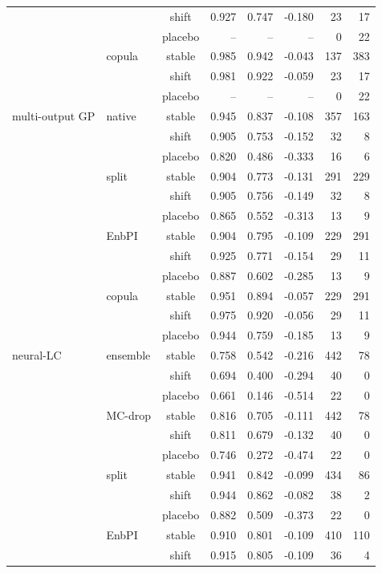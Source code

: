 {\begin{longtable}{@{}llcrrrrr@{}}
 &  & shift & 0.927 & 0.747 & -0.180 & 23 & 17 \\
 &  & placebo & -- & -- & -- & 0 & 22 \\
 & copula & stable & 0.985 & 0.942 & -0.043 & 137 & 383 \\
 &  & shift & 0.981 & 0.922 & -0.059 & 23 & 17 \\
 &  & placebo & -- & -- & -- & 0 & 22 \\
\addlinespace[2pt]
multi-output GP & native & stable & 0.945 & 0.837 & -0.108 & 357 & 163 \\
 &  & shift & 0.905 & 0.753 & -0.152 & 32 & 8 \\
 &  & placebo & 0.820 & 0.486 & -0.333 & 16 & 6 \\
 & split & stable & 0.904 & 0.773 & -0.131 & 291 & 229 \\
 &  & shift & 0.905 & 0.756 & -0.149 & 32 & 8 \\
 &  & placebo & 0.865 & 0.552 & -0.313 & 13 & 9 \\
 & EnbPI & stable & 0.904 & 0.795 & -0.109 & 229 & 291 \\
 &  & shift & 0.925 & 0.771 & -0.154 & 29 & 11 \\
 &  & placebo & 0.887 & 0.602 & -0.285 & 13 & 9 \\
 & copula & stable & 0.951 & 0.894 & -0.057 & 229 & 291 \\
 &  & shift & 0.975 & 0.920 & -0.056 & 29 & 11 \\
 &  & placebo & 0.944 & 0.759 & -0.185 & 13 & 9 \\
\addlinespace[2pt]
neural-LC & ensemble & stable & 0.758 & 0.542 & -0.216 & 442 & 78 \\
 &  & shift & 0.694 & 0.400 & -0.294 & 40 & 0 \\
 &  & placebo & 0.661 & 0.146 & -0.514 & 22 & 0 \\
 & MC-drop & stable & 0.816 & 0.705 & -0.111 & 442 & 78 \\
 &  & shift & 0.811 & 0.679 & -0.132 & 40 & 0 \\
 &  & placebo & 0.746 & 0.272 & -0.474 & 22 & 0 \\
 & split & stable & 0.941 & 0.842 & -0.099 & 434 & 86 \\
 &  & shift & 0.944 & 0.862 & -0.082 & 38 & 2 \\
 &  & placebo & 0.882 & 0.509 & -0.373 & 22 & 0 \\
 & EnbPI & stable & 0.910 & 0.801 & -0.109 & 410 & 110 \\
 &  & shift & 0.915 & 0.805 & -0.109 & 36 & 4 \\

\end{longtable}}
